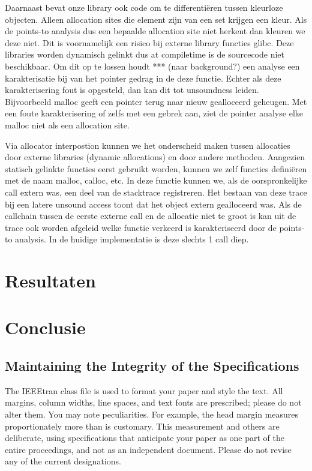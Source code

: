 \documentclass[conference]{IEEEtran}
\begin{document}
Daarnaast bevat onze library ook code om te differentiëren tussen kleurloze objecten. Alleen allocation sites die element zijn van een set krijgen een kleur. Als de points-to analysis dus een bepaalde allocation site niet herkent dan kleuren we deze niet. Dit is voornamelijk een risico bij externe library functies glibc. Deze libraries worden dynamisch gelinkt dus at compiletime is de sourcecode niet beschikbaar. Om dit op te lossen houdt *** (naar background?) een analyse een karakterisatie bij van het pointer gedrag in de deze functie. Echter als deze karakterisering fout is opgesteld, dan kan dit tot unsoundness leiden. Bijvoorbeeld malloc geeft een pointer terug naar nieuw gealloceerd geheugen. Met een foute karakterisering of zelfs met een gebrek aan, ziet de pointer analyse elke malloc niet als een allocation site. 

Via allocator interpostion kunnen we het onderscheid maken tussen allocaties door externe libraries (dynamic allocations) en door andere methoden. Aangezien statisch gelinkte functies eerst gebruikt worden, kunnen we zelf functies definiëren met de naam malloc, calloc, etc. In deze functie kunnen we, als de oorspronkelijke call extern was, een deel van de stacktrace registreren. Het bestaan van deze trace bij een latere unsound access toont dat het object extern gealloceerd was. Als de callchain tussen de eerste externe call en de allocatie niet te groot is kan uit de trace ook worden afgeleid welke functie verkeerd is karakteriseerd door de points-to analysis. In de huidige implementatie is deze slechts 1 call diep.



\section{Resultaten} 



\section{Conclusie}

\subsection{Maintaining the Integrity of the Specifications}

The IEEEtran class file is used to format your paper and style the text. All margins,
column widths, line spaces, and text fonts are prescribed; please do not
alter them. You may note peculiarities. For example, the head margin
measures proportionately more than is customary. This measurement
and others are deliberate, using specifications that anticipate your paper
as one part of the entire proceedings, and not as an independent document.
Please do not revise any of the current designations.
\end{document}
